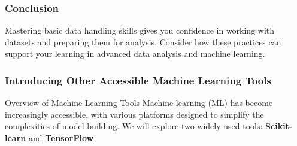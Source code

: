 \documentclass[aspectratio=169]{beamer}
\begin{document}
\begin{frame}[fragile]
    \frametitle{Conclusion}
    Mastering basic data handling skills gives you confidence in working with datasets and preparing them for analysis. Consider how these practices can support your learning in advanced data analysis and machine learning.
\end{frame}

\begin{frame}
    \frametitle{Introducing Other Accessible Machine Learning Tools}
    \begin{block}{Overview of Machine Learning Tools}
        Machine learning (ML) has become increasingly accessible, with various platforms designed to simplify the complexities of model building. We will explore two widely-used tools: \textbf{Scikit-learn} and \textbf{TensorFlow}.
    \end{block}
\end{frame}
\end{document}
